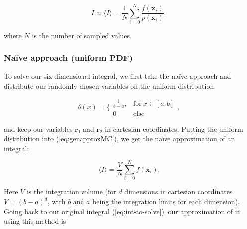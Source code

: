 \documentclass[../main.tex]{subfiles}
\begin{document}
\begin{equation}
  I \approx \langle I \rangle = \frac{1}{N}\sum_{i=0}^N\frac{f(\mathbf x_i)}{p(\mathbf x_i)},
  \label{eq:genapproxMC}
\end{equation}

where  $N$ is the number of sampled values.

\subsubsection{Naïve approach (uniform PDF)}
To solve our six-dimensional integral, we first take the naïve approach and distribute our randomly chosen variables on the uniform distribution

\begin{equation*}
  \theta (x) = \bigg\{ \begin{matrix}\frac{1}{b-a}, & \text{for}\ x\in[a,b] \\ 0 & \text{else}\end{matrix},
\end{equation*}

and keep our variables $\mathbf r_1$ and $\mathbf r_2$ in cartesian coordinates. Putting the uniform distribution into (\ref{eq:genapproxMC}), we get the naïve approximation of an integral:

\begin{equation}
  \langle I\rangle = \frac{V}{N}\sum_{i=0}^Nf(\mathbf x_i).
\end{equation}

Here $V$ is the integration volume (for $d$ dimensions in cartesian coordinates $V=(b-a)^d$, with $b$ and $a$ being the integration limits for each dimension). Going back to our original integral (\ref{eq:int-to-solve}), our approximation of it using this method is
\end{document}
